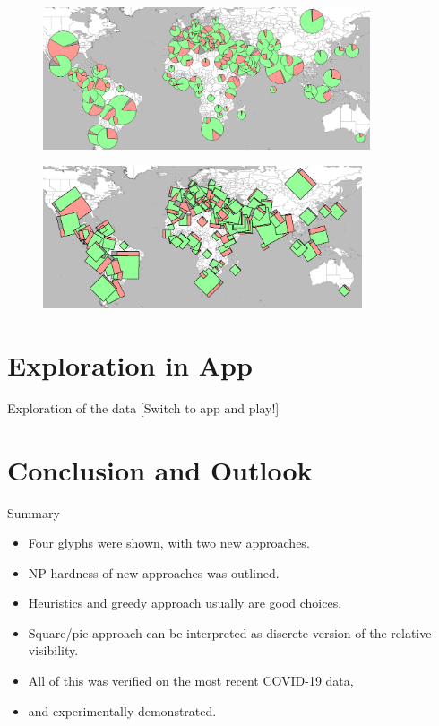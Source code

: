 \documentclass{beamer}
\begin{document}
\begin{frame}
\begin{figure}[!b]
  \centering
  \includegraphics[height=4.2cm]{assets/pieChartsEval.png}
\end{figure}

\begin{figure}[b]
  \centering
  \includegraphics[height=4.2cm]{assets/squaresEval.png}
\end{figure}
\end{frame}



  \section{Exploration in App}

  \begin{frame}{Exploration of the data}
    [Switch to app and play!]
  \end{frame}

  \section{Conclusion and Outlook}

  \begin{frame}{Summary}

    \begin{itemize}
      \item Four glyphs were shown, with two new approaches.
      \item NP-hardness of new approaches was outlined.
      \item Heuristics and greedy approach usually are good choices.
      \item Square/pie approach can be interpreted as discrete version of the relative visibility.
      \item All of this was verified on the most recent COVID-19 data,
      \item and experimentally demonstrated.
    \end{itemize}
  \end{frame}
\end{document}
